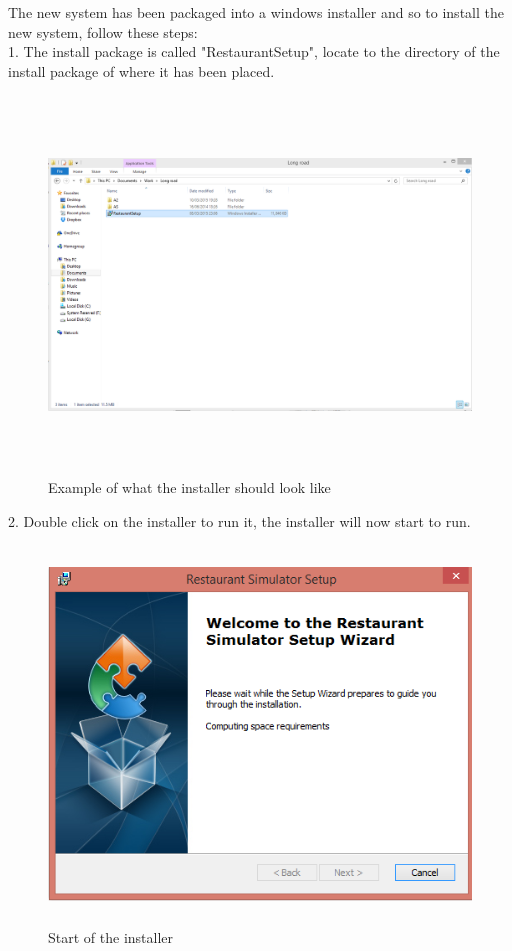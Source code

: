 \begin{landscape}
The new system has been packaged into a windows installer and so to install the new system, follow these steps: \\
1. The install package is called "RestaurantSetup", locate to the directory of the install package of where it has been placed. 

\begin{figure}[H]
    \includegraphics[height = 10cm]{./Manual/images/install1} 
    \caption{Example of what the installer should look like} \label{fig:install1}
\end{figure}


2. Double click on the installer to run it, the installer will now start to run.

\begin{figure}[H]
    \includegraphics[height = 10cm]{./Manual/images/install2} 
    \caption{Start of the installer} \label{fig:install2}
\end{figure}


\end{landscape}
